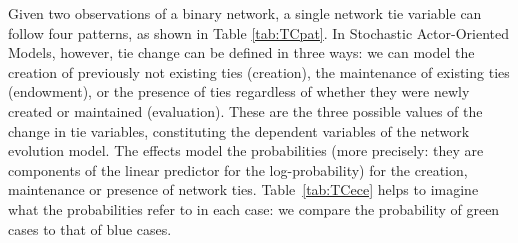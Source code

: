 \documentclass[a4paper,fleqn,11pt]{article}
\newcommand{\+}{\, + \,}
\newcommand{\saom}{{Stochastic Actor-Oriented Model}}
\begin{document}
Given two observations of a binary network, a single network tie variable
can follow four patterns, as shown in Table \ref{tab:TCpat}.
In {\saom}s, however, tie change can be
defined in three ways: we can model the creation of previously not
existing ties (creation), the maintenance of existing ties (endowment),
or the presence of ties regardless of whether they were newly created
or maintained (evaluation). These are the three possible values of the
change in tie variables, constituting the dependent
variables of the network evolution model.
The effects model the probabilities
(more precisely: they are components of the linear
predictor for the log-probability)
for the creation, maintenance or
presence of network ties. Table~\ref{tab:TCece} helps to imagine
what the probabilities refer to in each case: we compare the probability of
green cases to that of blue cases.
\end{document}
